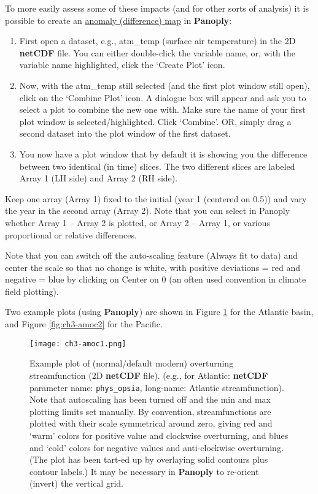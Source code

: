 \documentclass[11pt,fleqn]{book} %
\begin{document}
\noindent To more easily assess some of these impacts (and for other sorts of analysis) it is possible to create an \uline{anomaly (difference) map} in \textbf{Panoply}:

\vspace{1mm}
\begin{enumerate}[noitemsep]
\vspace{1mm}
\item  First open a dataset, e.g., \textsf{\footnotesize atm\_temp} (surface air temperature) in the 2D \textbf{netCDF} file. You can either double-click the variable name, or, with the variable name highlighted, click the ‘Create Plot’ icon.
\vspace{1mm}
\item Now, with the \textsf{\footnotesize atm\_temp} still selected (and the first plot window still open), click on the ‘Combine Plot’ icon. A dialogue box will appear and ask you to select a plot to combine the new one with. Make sure the name of your first plot window is selected/highlighted. Click ‘Combine’. OR, simply drag a second dataset into the plot window of the first dataset.
\vspace{1mm}
\item You now have a plot window that by default it is showing you the difference between two identical (in time) slices. The two different slices are labeled Array 1 (LH side) and Array 2 (RH side).
\end{enumerate}
\vspace{1mm}

Keep one array (Array 1) fixed to the initial (year 1 (centered on 0.5)) and vary the year in the second array (Array 2). Note that you can select in Panoply whether Array 1 – Array 2 is plotted, or Array 2 – Array 1, or various proportional or relative differences.

Note that you can switch off the auto-scaling feature (Always fit to data) and center the scale so that no change is white, with positive deviations = red and negative = blue by clicking on Center on 0 (an often used convention in climate field plotting).

Two example plots (using \textbf{Panoply}) are shown in Figure \ref{fig:ch3-amoc1} for the Atlantic basin, and Figure \ref{fig:ch3-amoc2} for the Pacific.

\begin{figure}
\texttt{[image: ch3-amoc1.png]}\centering
\vspace{-0mm}
\caption{Example plot of (normal/default modern) overturning streamfunction (2D \textbf{netCDF} file). (e.g., for Atlantic: \textbf{netCDF} parameter name: \texttt{phys\_opsia}, long-name: Atlantic streamfunction). Note that autoscaling has been turned off and the min and max plotting limits set manually. By convention, streamfunctions are plotted with their scale symmetrical around zero, giving red and ‘warm’ colors for positive value and clockwise overturning, and blues and ‘cold’ colors for negative values and anti-clockwise overturning. (The plot has been tart-ed up by overlaying solid contours plus contour labels.) It may be necessary in \textbf{Panoply} to re-orient (invert) the vertical grid.}
\label{fig:ch3-amoc1}
\end{figure}
\end{document}
